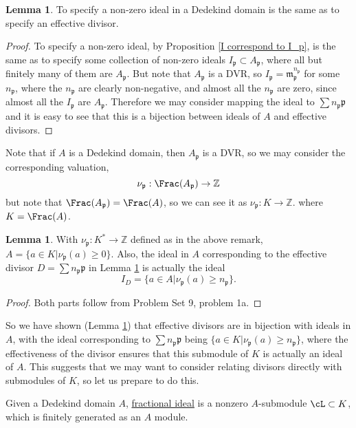 \documentclass[12 pt]{article}
\theoremstyle{definition}
\newtheorem{lemma}[theorem]{Lemma}
\newcommand\zz{\mathbb{Z}}
\newcommand\fp{{\mathfrak p}}
\begin{document}
\begin{lemma} To specify a non-zero ideal in a Dedekind domain is the same as to specify an effective divisor.
\label{Dedekind means nonzero ideals are effective divisors}
\end{lemma}
\begin{proof} To specify a non-zero ideal, by Proposition \ref{I correspond to I_p}, is the same as to specify some collection of non-zero ideals $I_{\fp} \subset A_{\fp}$, where all but finitely many of them are $A_{\fp}$. But note that $A_{\fp}$ is a DVR, so $I_{\fp}=\mathfrak{m}_{\fp}^{n_\fp}$ for some $n_{\fp}$, where the $n_{\fp}$ are clearly non-negative, and almost all the $n_{\fp}$ are zero, since almost all the $I_{\fp}$ are $A_{\fp}$. Therefore we may consider mapping the ideal to $\sum n_{\fp} \fp$ and it is easy to see that this is a bijection between ideals of $A$ and effective divisors.
\end{proof}
\begin{remark} Note that if $A$ is a Dedekind domain, then $A_{\fp}$ is a DVR, so we may consider the corresponding valuation,
\[\nu_{\fp}:\Frac(A_{\fp}) \to \zz\]
but note that $\Frac(A_{\fp})=\Frac(A)$, so we can see it as $\nu_{\fp}:K \to \zz$. where $K=\Frac(A)$.
\label{valuations remark}
\end{remark}

\begin{lemma} With $\nu_{\fp}:K^* \to \zz$ defined as in the above remark, $A=\{a \in K| \nu_{\fp}(a) \geq 0\}$. Also, the ideal in $A$ corresponding to the effective divisor $D= \sum n_{\fp} \fp$ in Lemma \ref{Dedekind means nonzero ideals are effective divisors} is actually the ideal
\[I_D=\{a \in A| \nu_{\fp}(a) \geq n_{\fp}\}.\]
\label{Dedekind means ideals=eff div, valuations version}
\end{lemma}
\begin{proof} Both parts follow from Problem Set 9, problem 1a.
\end{proof}


So we have shown (Lemma \ref{Dedekind means ideals=eff div, valuations version}) that effective divisors are in bijection with ideals in $A$, with the ideal corresponding to $\sum n_{\fp} \fp$ being $\{a \in K|\nu_{\fp}(a) \geq n_{\fp}\}$, where the effectiveness of the divisor ensures that this submodule of $K$ is actually an ideal of $A$. This suggests that we may want to consider relating divisors directly with submodules of $K$, so let us prepare to do this.


\begin{definition} Given a Dedekind domain $A$, \uline{fractional ideal} is a nonzero $A$-submodule $\cL \subset K$, which is finitely generated as an $A$ module.
\end{definition}
\end{document}

